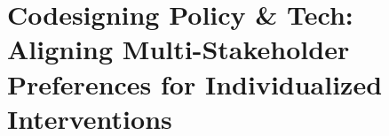 \chapter{Codesigning Policy \& Tech: Aligning Multi-Stakeholder Preferences for Individualized Interventions}